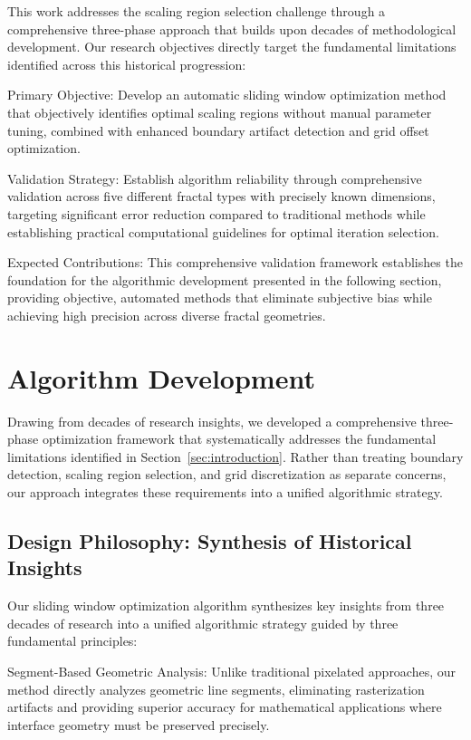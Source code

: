 \documentclass[preprint,12pt]{elsarticle}
\def\textbf#1{#1}%
\begin{document}
This work addresses the scaling region selection challenge through a comprehensive three-phase approach that builds upon decades of methodological development. Our research objectives directly target the fundamental limitations identified across this historical progression:

\textbf{Primary Objective}: Develop an automatic sliding window optimization method that objectively identifies optimal scaling regions without manual parameter tuning, combined with enhanced boundary artifact detection and grid offset optimization.

\textbf{Validation Strategy}: Establish algorithm reliability through comprehensive validation across five different fractal types with precisely known dimensions, targeting significant error reduction compared to traditional methods while establishing practical computational guidelines for optimal iteration selection.

\textbf{Expected Contributions}: This comprehensive validation framework establishes the foundation for the algorithmic development presented in the following section, providing objective, automated methods that eliminate subjective bias while achieving high precision across diverse fractal geometries.

\section{Algorithm Development}
\label{sec:algorithm}

Drawing from decades of research insights, we developed a comprehensive three-phase optimization framework that systematically addresses the fundamental limitations identified in Section~\ref{sec:introduction}. Rather than treating boundary detection, scaling region selection, and grid discretization as separate concerns, our approach integrates these requirements into a unified algorithmic strategy.

\subsection{Design Philosophy: Synthesis of Historical Insights}

Our sliding window optimization algorithm synthesizes key insights from three decades of research into a unified algorithmic strategy guided by three fundamental principles:

\textbf{Segment-Based Geometric Analysis}: Unlike traditional pixelated approaches, our method directly analyzes geometric line segments, eliminating rasterization artifacts and providing superior accuracy for mathematical applications where interface geometry must be preserved precisely.
\end{document}
